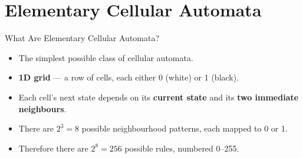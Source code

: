 \section{Elementary Cellular Automata}

\begin{frame}{What Are Elementary Cellular Automata?}
  \begin{itemize}
    \item The simplest possible class of cellular automata.
    \item \textbf{1D grid} --- a row of cells, each either 0 (white) or 1 (black).
    \item Each cell's next state depends on its \textbf{current state} and its \textbf{two immediate neighbours}.
    \item There are $2^3 = 8$ possible neighbourhood patterns, each mapped to 0 or 1.
    \item Therefore there are $2^8 = 256$ possible rules, numbered 0--255.
  \end{itemize}
  \vfill
  \begin{center}
  \end{center}
\end{frame}

